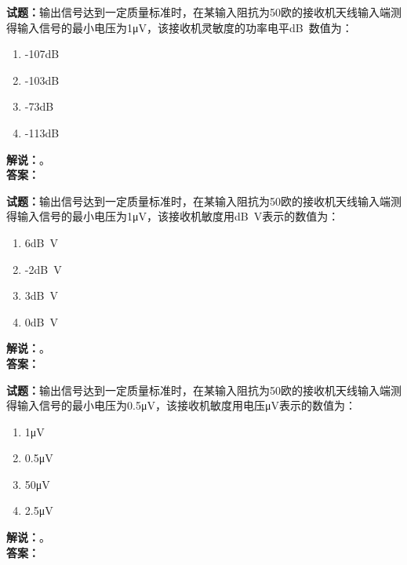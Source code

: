 \documentclass{ctexbook}
\begin{document}
\bigskip




\noindent\textbf{试题：}输出信号达到一定质量标准时，在某输入阻抗为50欧的接收机天线输入端测得输入信号的最小电压为1μV，该接收机灵敏度的功率电平\unit[qualifier-mode=combine]{\deci\bel{}}数值为：
\begin{enumerate}[leftmargin=3em]
\item -107\unit[qualifier-mode=combine]{\deci\bel{}}
\item -103\unit[qualifier-mode=combine]{\deci\bel{}}
\item -73\unit[qualifier-mode=combine]{\deci\bel{}}
\item -113\unit[qualifier-mode=combine]{\deci\bel{}}
\end{enumerate}
\noindent\textbf{解说：}\textbf{}。\\\noindent\textbf{答案：}

\bigskip




\noindent\textbf{试题：}输出信号达到一定质量标准时，在某输入阻抗为50欧的接收机天线输入端测得输入信号的最小电压为1μV，该接收机敏度用\unit[qualifier-mode=combine]{\deci\bel{}}V表示的数值为：
\begin{enumerate}[leftmargin=3em]
\item 6\unit[qualifier-mode=combine]{\deci\bel{}}V
\item -2\unit[qualifier-mode=combine]{\deci\bel{}}V
\item 3\unit[qualifier-mode=combine]{\deci\bel{}}V
\item 0\unit[qualifier-mode=combine]{\deci\bel{}}V
\end{enumerate}
\noindent\textbf{解说：}\textbf{}。\\\noindent\textbf{答案：}

\bigskip




\noindent\textbf{试题：}输出信号达到一定质量标准时，在某输入阻抗为50欧的接收机天线输入端测得输入信号的最小电压为0.5μV，该接收机敏度用电压μV表示的数值为：
\begin{enumerate}[leftmargin=3em]
\item 1μV
\item 0.5μV
\item 50μV
\item 2.5μV
\end{enumerate}
\noindent\textbf{解说：}\textbf{}。\\\noindent\textbf{答案：}
\end{document}

